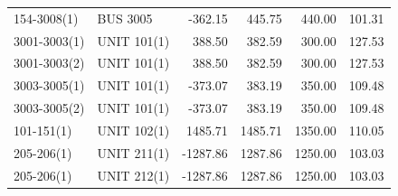 \documentclass[10pt]{report}
\begin{document}
\begin{table}[H]
{\begin{tabular}{llrrrr}
154-3008(1) & BUS 3005 & -362.15 & 445.75 & 440.00 & 101.31 \\
3001-3003(1) & UNIT 101(1) & 388.50 & 382.59 & 300.00 & 127.53 \\
3001-3003(2) & UNIT 101(1) & 388.50 & 382.59 & 300.00 & 127.53 \\
3003-3005(1) & UNIT 101(1) & -373.07 & 383.19 & 350.00 & 109.48 \\
3003-3005(2) & UNIT 101(1) & -373.07 & 383.19 & 350.00 & 109.48 \\
101-151(1) & UNIT 102(1) & 1485.71 & 1485.71 & 1350.00 & 110.05 \\
205-206(1) & UNIT 211(1) & -1287.86 & 1287.86 & 1250.00 & 103.03 \\
205-206(1) & UNIT 212(1) & -1287.86 & 1287.86 & 1250.00 & 103.03 \\
\bottomrule
\end{tabular}}
\end{table}
\end{document}
